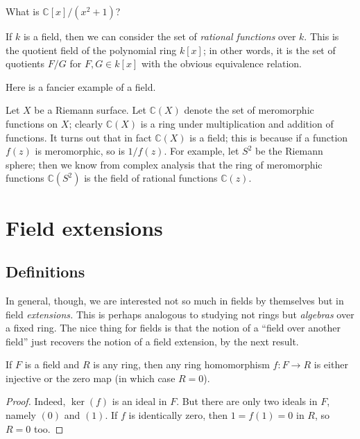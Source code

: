 \begin{exercise} 
What is $\mathbb{C}[x]/(x^2 + 1)$?
\end{exercise} 


\begin{example} \label{monofldext} 
If $k$ is a field, then we can consider the set of \emph{rational functions}
over $k$. This is the quotient field of the polynomial ring $k[x]$; in other
words, it is the set of quotients $F/G$ for $F, G \in k[x]$ with the obvious
equivalence relation.
\end{example} 


Here is a fancier example of a field.
\begin{example} 
\label{meromorphicfn}
Let $X$ be a Riemann surface. Let $\mathbb{C}(X)$ denote the
set of meromorphic functions on $X$; clearly $\mathbb{C}(X)$ is a ring under
multiplication and addition of functions. It turns out that in fact
$\mathbb{C}(X)$ is a
field; this is because if a function $f(z)$ is meromorphic, so is $1/f(z)$. For example,
let $S^2$ be the Riemann sphere; then we know from complex
analysis that the ring of meromorphic functions $\mathbb{C}(S^2)$ is the
field of rational functions $\mathbb{C}(z)$. 
\end{example}


\section{Field extensions}

\subsection{Definitions}

In general, though, we are interested not so much in fields by themselves but
in field \emph{extensions.} This is perhaps analogous to studying not rings
but \emph{algebras} over a fixed ring.
The nice thing for fields is that the notion of a ``field over another field''
just recovers the notion of a field extension, by the next result.

\begin{proposition} \label{fieldinj} If $F$ is a field and $R$ is any ring, then any ring homomorphism $f:F\rightarrow
R$ is either injective or the zero map (in which case $R=0$).
\end{proposition}

\begin{proof} Indeed, $\ker(f)$ is an ideal in
$F$. But there are only two ideals in $F$, namely $(0)$ and $(1)$. If $f$ is identically
zero, then $1=f(1)=0$ in $R$, so $R=0$ too.
\end{proof}

